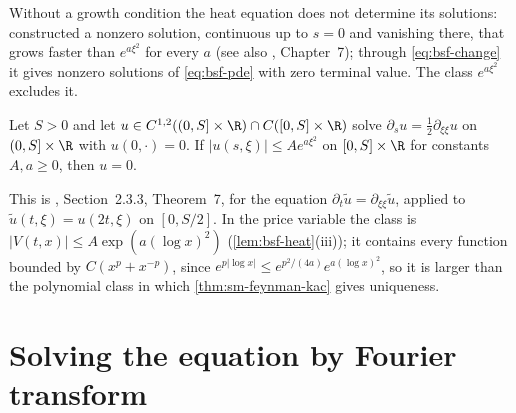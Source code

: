 Without a growth condition the heat equation does not determine its solutions: \textcite{tychonoff-heat}
constructed a nonzero solution, continuous up to $s=0$ and vanishing there, that grows faster than
$e^{a\xi^2}$ for every $a$ (see also \textcite{john-pde}, Chapter~7); through \eqref{eq:bsf-change} it gives
nonzero solutions of \eqref{eq:bsf-pde} with zero terminal value. The class $e^{a\xi^2}$ excludes it.

\begin{theorem}\label{thm:bsf-tychonoff}
Let $S>0$ and let $u\in C^{1,2}((0,S]\times\R)\cap C([0,S]\times\R)$ solve
$\partial_su=\frac12\partial_{\xi\xi}u$ on $(0,S]\times\R$ with $u(0,\cdot)=0$. If
$|u(s,\xi)|\le Ae^{a\xi^2}$ on $[0,S]\times\R$ for constants $A,a\ge0$, then $u=0$.
\end{theorem}

This is \textcite{evans-pde}, Section~2.3.3, Theorem~7, for the equation $\partial_t\tilde u=\partial_{\xi\xi}\tilde u$,
applied to $\tilde u(t,\xi)=u(2t,\xi)$ on $[0,S/2]$. In the price variable the class is
$|V(t,x)|\le A\exp(a(\log x)^2)$ (\cref{lem:bsf-heat}(iii)); it contains every function bounded by
$C(x^p+x^{-p})$, since $e^{p|\log x|}\le e^{p^2/(4a)}e^{a(\log x)^2}$, so it is larger than the
polynomial class in which \cref{thm:sm-feynman-kac} gives uniqueness.

\section{Solving the equation by Fourier transform}\label{sec:bsf-fourier}

